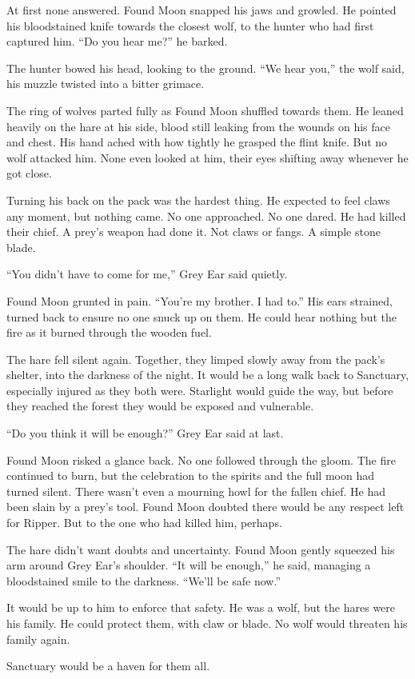At first none answered. Found Moon snapped his jaws and growled. He pointed his bloodstained knife towards the closest wolf, to the hunter who had first captured him. ``Do you hear me?'' he barked.

The hunter bowed his head, looking to the ground. ``We hear you,'' the wolf said, his muzzle twisted into a bitter grimace.

The ring of wolves parted fully as Found Moon shuffled towards them. He leaned heavily on the hare at his side, blood still leaking from the wounds on his face and chest. His hand ached with how tightly he grasped the flint knife. But no wolf attacked him. None even looked at him, their eyes shifting away whenever he got close.

Turning his back on the pack was the hardest thing. He expected to feel claws any moment, but nothing came. No one approached. No one dared. He had killed their chief. A prey's weapon had done it. Not claws or fangs. A simple stone blade.

``You didn't have to come for me,'' Grey Ear said quietly.

Found Moon grunted in pain. ``You're my brother. I had to.'' His ears strained, turned back to ensure no one snuck up on them. He could hear nothing but the fire as it burned through the wooden fuel.

The hare fell silent again. Together, they limped slowly away from the pack's shelter, into the darkness of the night. It would be a long walk back to Sanctuary, especially injured as they both were. Starlight would guide the way, but before they reached the forest they would be exposed and vulnerable.

``Do you think it will be enough?'' Grey Ear said at last.

Found Moon risked a glance back. No one followed through the gloom. The fire continued to burn, but the celebration to the spirits and the full moon had turned silent. There wasn't even a mourning howl for the fallen chief. He had been slain by a prey's tool. Found Moon doubted there would be any respect left for Ripper. But to the one who had killed him, perhaps.

The hare didn't want doubts and uncertainty. Found Moon gently squeezed his arm around Grey Ear's shoulder. ``It will be enough,'' he said, managing a bloodstained smile to the darkness. ``We'll be safe now.''

It would be up to him to enforce that safety. He was a wolf, but the hares were his family. He could protect them, with claw or blade. No wolf would threaten his family again.

Sanctuary would be a haven for them all.
